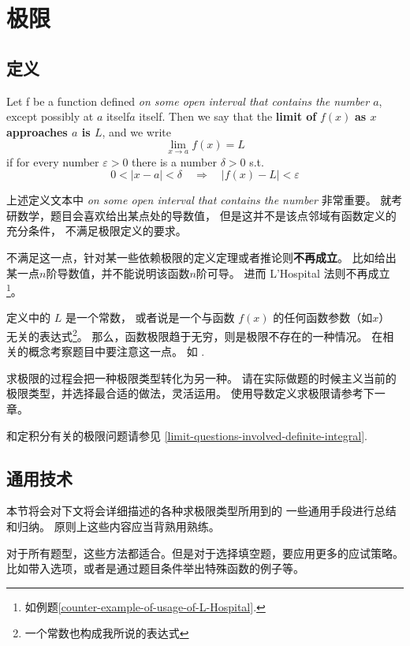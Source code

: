 \chapter{极限}

\section{定义}
\label{def-limit}

\begin{definition}
    \label{def:limit}
    Let f be a function defined \emph{on some open interval that contains the number $a$}, 
    except possibly at $a$ itself$a$ itself.
    Then we say that the \textbf{limit of } $f(x)$ 
    \textbf{as $x$ approaches $a$ is $L$}, 
    and we write 
    \[
        \lim_{x \to a} f(x) = L
    \]
    if for every number $\varepsilon > 0$ there is a number $\delta > 0$ s.t.
    \[
        0 < |x - a| < \delta \quad \Rightarrow \quad |f(x) - L| < \varepsilon
    \]
\end{definition}
上述定义文本中 
\emph{on some open interval that contains the number} 非常重要。
就考研数学，题目会喜欢给出某点处的导数值，
但是这并不是该点邻域有函数定义的充分条件，
不满足极限定义的要求。

不满足这一点，针对某一些依赖极限的定义定理或者推论则\textbf{不再成立}。
比如给出某一点$n$阶导数值，并不能说明该函数$n$阶可导。
进而 L'Hospital 法则不再成立
\footnote{如例题\ref{counter-example-of-usage-of-L-Hospital}.}。

定义中的 $L$ 是一个常数，
或者说是一个与函数 $f(x)$ 的任何函数参数（如$x$）
无关的表达式\footnote{一个常数也构成我所说的表达式}。
那么，函数极限趋于无穷，则是极限不存在的一种情况。
在相关的概念考察题目中要注意这一点。
如 \cite[question 123]{w660}.

求极限的过程会把一种极限类型转化为另一种。
请在实际做题的时候主义当前的极限类型，并选择最合适的做法，灵活运用。
使用导数定义求极限请参考下一章。

和定积分有关的极限问题请参见
\ref{limit-questions-involved-definite-integral}.

\section{通用技术}

本节将会对下文将会详细描述的各种求极限类型所用到的
一些通用手段进行总结和归纳。 原则上这些内容应当背熟用熟练。

对于所有题型，这些方法都适合。但是对于选择填空题，要应用更多的应试策略。
比如带入选项，或者是通过题目条件举出特殊函数的例子等。

